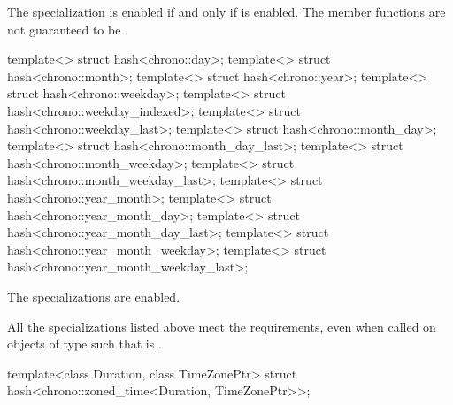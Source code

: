 \begin{itemdescr}
\pnum
The specialization  is enabled
if and only if  is enabled.
The member functions are not guaranteed to be .
\end{itemdescr}

%
%
%
%
%
%
%
%
%
%
%
%
%
%
%
\begin{itemdecl}
template<> struct hash<chrono::day>;
template<> struct hash<chrono::month>;
template<> struct hash<chrono::year>;
template<> struct hash<chrono::weekday>;
template<> struct hash<chrono::weekday_indexed>;
template<> struct hash<chrono::weekday_last>;
template<> struct hash<chrono::month_day>;
template<> struct hash<chrono::month_day_last>;
template<> struct hash<chrono::month_weekday>;
template<> struct hash<chrono::month_weekday_last>;
template<> struct hash<chrono::year_month>;
template<> struct hash<chrono::year_month_day>;
template<> struct hash<chrono::year_month_day_last>;
template<> struct hash<chrono::year_month_weekday>;
template<> struct hash<chrono::year_month_weekday_last>;
\end{itemdecl}

\begin{itemdescr}
\pnum
The specializations are enabled.
\begin{note}
All the  specializations listed above meet the
 requirements, even when called on objects 
of type  such that  is .
\end{note}
\end{itemdescr}

%
\begin{itemdecl}
template<class Duration, class TimeZonePtr>
  struct hash<chrono::zoned_time<Duration, TimeZonePtr>>;
\end{itemdecl}

